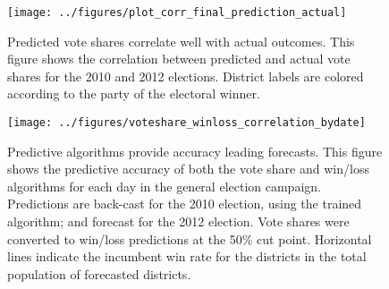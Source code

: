 \documentclass{article}
\begin{document}
\begin{figure}[ht]
  \centering
  \texttt{[image: ../figures/plot\_corr\_final\_prediction\_actual]}
  \caption{Predicted vote shares correlate well with actual
    outcomes. This figure shows the correlation between predicted and
    actual vote shares for the 2010 and 2012 elections. District
    labels are colored according to the party of the electoral winner.}
  \label{fig:corr-voteshare}
\end{figure}

\begin{figure*}[ht]
  \centering
  \texttt{[image: ../figures/voteshare\_winloss\_correlation\_bydate]}
  \caption{Predictive algorithms provide accuracy leading
    forecasts. This figure shows the predictive accuracy of both the
    vote share and win/loss algorithms for each day in the general election campaign. Predictions are back-cast for the 2010 election, using the trained algorithm; and forecast for the 2012 election. Vote shares were converted to win/loss predictions at the 50\% cut point. Horizontal lines indicate the incumbent win rate for the districts in the total population of forecasted districts.}
  \label{fig:prediction-corr-bydate}
\end{figure*}





\end{document}
